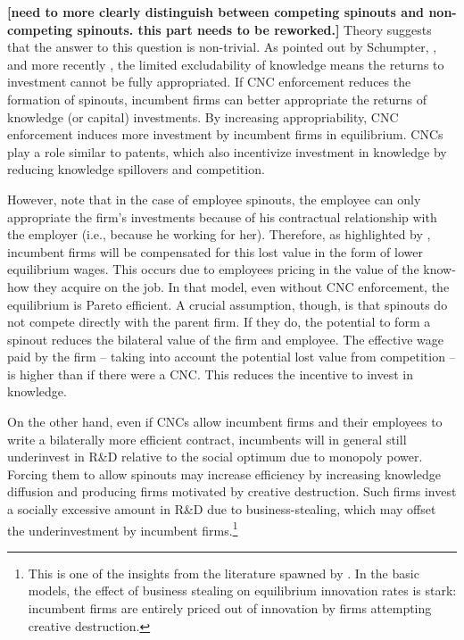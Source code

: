 \documentclass[12pt,english]{article}
\theoremstyle{remark}
\begin{document}
\textbf{[need to more clearly distinguish between competing spinouts and non-competing spinouts. this part needs to be reworked.]}
Theory suggests that the answer to this question is non-trivial. As pointed out by Schumpter, \cite{arrow_economic_1962}, and more recently \cite{romer_increasing_1986}, the limited excludability of knowledge means the returns to investment cannot be fully appropriated. If CNC enforcement reduces the formation of spinouts, incumbent firms can better appropriate the returns of knowledge (or capital) investments. By increasing appropriability, CNC enforcement induces more investment by incumbent firms in equilibrium. CNCs play a role similar to patents, which also incentivize investment in knowledge by reducing knowledge spillovers and competition.

However, note that in the case of employee spinouts, the employee can only appropriate the firm's investments because of his contractual relationship with the employer  (i.e., because he working for her).  Therefore, as highlighted by \cite{franco_spin-outs:_2006}, incumbent firms will be compensated for this lost value in the form of lower equilibrium wages. This occurs due to employees pricing in the value of the know-how they acquire on the job. In that model, even without CNC enforcement, the equilibrium is Pareto efficient. A crucial assumption, though, is that spinouts do not compete directly with the parent firm. If they do, the potential to form a spinout reduces the bilateral value of the firm and employee. The effective wage paid by the firm -- taking into account the potential lost value from competition -- is higher than if there were a CNC. This reduces the incentive to invest in knowledge. 

On the other hand, even if CNCs allow incumbent firms and their employees to write a bilaterally more efficient contract, incumbents will in general still underinvest in R\&D relative to the social optimum due to monopoly power. Forcing them to allow spinouts may increase efficiency by increasing knowledge diffusion and producing firms motivated by creative destruction. Such firms invest a socially excessive amount in R\&D due to business-stealing, which may offset the underinvestment by incumbent firms.\footnote{This is one of the insights from the literature spawned by \cite{grossman_quality_1991}. In the basic models, the effect of business stealing on equilibrium innovation rates is stark: incumbent firms are entirely priced out of innovation by firms attempting creative destruction.}
\end{document}

